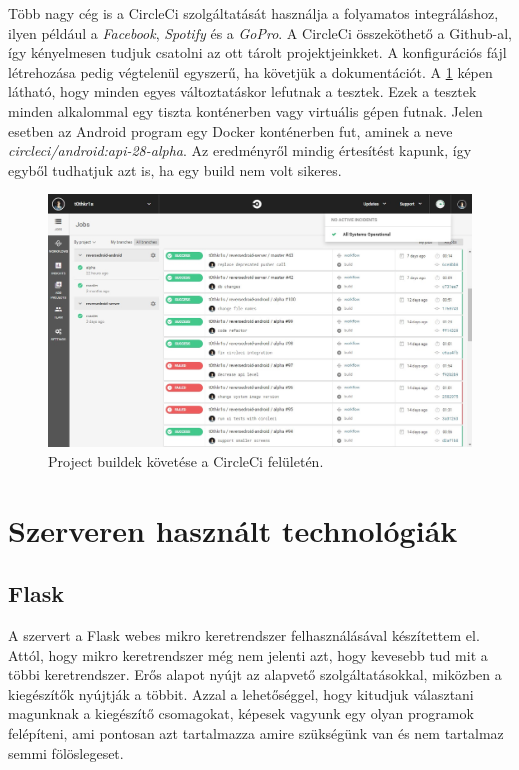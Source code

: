 \documentclass{thesis-ekf}
\theoremstyle{definition}
\theoremstyle{remark}
\begin{document}
Több nagy cég is a CircleCi szolgáltatását használja a folyamatos integráláshoz, ilyen például a \emph{Facebook}, \emph{Spotify} és a \emph{GoPro}.
A CircleCi összeköthető a Github-al, így kényelmesen tudjuk csatolni az ott tárolt projektjeinkket.
A konfigurációs fájl létrehozása pedig végtelenül egyszerű, ha követjük a dokumentációt.
A \ref{circleci} képen látható, hogy minden egyes változtatáskor lefutnak a tesztek.
Ezek a tesztek minden alkalommal egy tiszta konténerben vagy virtuális gépen futnak.
Jelen esetben az Android program egy Docker konténerben fut, aminek a neve \emph{circleci/android:api-28-alpha}.
Az eredményről mindig értesítést kapunk, így egyből tudhatjuk azt is, ha egy build nem volt sikeres.


\begin{figure}[!h]
	\centering
	\includegraphics[width=15cm]{pictures/circleci}
	\caption{Project buildek követése a CircleCi felületén.}
	\label{circleci}
\end{figure}

\newpage

\section{Szerveren használt technológiák}\label{szerveren_hasznalt_technologiak}

\subsection{Flask}

A szervert a Flask webes mikro keretrendszer felhasználásával készítettem el.
Attól, hogy mikro keretrendszer még nem jelenti azt, hogy kevesebb tud mit a többi keretrendszer.
Erős alapot nyújt az alapvető szolgáltatásokkal, miközben a kiegészítők nyújtják a többit.
Azzal a lehetőséggel, hogy kitudjuk választani magunknak a kiegészítő csomagokat, képesek vagyunk egy olyan programok felépíteni, ami pontosan azt tartalmazza amire szükségünk van és nem tartalmaz semmi fölöslegeset.
\end{document}
